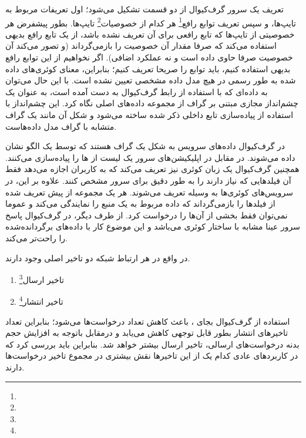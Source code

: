 تعریف یک سرور گرف‌کیوال از دو قسمت تشکیل می‌شود؛ اول تعریفات مربوط به تایپ‌ها، و سپس تعریف توابع رافع\footnote{} هر کدام از خصوصیات\footnote{} تایپ‌ها. بطور پیشفرض هر خصوصیتی از تایپ‌ها که تابع رافعی برای آن تعریف نشده باشد، از یک تابع رافع بدیهی استفاده می‌کند که صرفا مقدار آن خصوصیت را بازمی‌گرداند (و تصور می‌کند آن خصوصیت صرفا حاوی داده است و نه عملکرد اضافی). اگر نخواهیم از این توابع رافع بدیهی استفاده کنیم، باید توابع را صریحا تعریف کنیم؛ بنابراین، معنای کوئری‌های داده شده به طور رسمی در هیچ مدل داده‌ مشخصی تعیین نشده است. با این حال می‌توان به داده‌ای که با استفاده از رابط گرف‌کیوال به دست آمده است، به عنوان یک چشم‌انداز مجازی مبتنی بر گراف از مجموعه داده‌های اصلی نگاه کرد. این چشم‌انداز با استفاده از پیاده‌سازی تابع داخلی ذکر شده ساخته می‌شود و شکل آن مانند یک گراف متشابه با گراف مدل داده‌هاست\cite{hartig2017initial}.

\newpage


در گرف‌کیوال داده‌های سرویس به شکل یک گراف هستند که توسط یک الگو نشان داده می‌شوند. در مقابل در  اپلیکیشن‌های سرور یک لیست از ها را پیاده‌سازی می‌کنند. همچنین گرف‌کیوال یک زبان کوئری نیز تعریف می‌کند که به کاربران اجازه می‌دهد فقط آن فیلدهایی که نیاز دارند را به طور دقیق برای سرور مشخص کنند. علاوه بر این، در سرویس‌های  کوئری‌ها به وسیله  تعریف می‌شوند. هر  یک مجموعه از پیش تعریف شده از فیلدها را بازمی‌گرداند که داده مربوط به یک منبع را نمایندگی می‌کند و عموما نمی‌توان فقط بخشی از آن‌ها را درخواست کرد. از طرف دیگر، در گرف‌کیوال پاسخ سرور عینا مشابه با ساختار کوئری می‌باشد و این موضوع کار با داده‌های برگردانده‌شده را راحت‌تر می‌کند\cite{brito2020rest}.

در واقع در هر ارتباط شبکه دو تاخیر اصلی وجود دارند.
\begin{enumerate}
	\item تاخیر ارسال\footnote{}
	\item تاخیر انتشار\footnote{}
\end{enumerate}

استفاده از گرف‌کیوال بجای ،‌ باعث کاهش تعداد درخواست‌ها می‌شود؛ بنابراین تعداد تاخیرهای انتشار بطور قابل توجهی کاهش می‌یابد و درمقابل باتوجه به افزایش حجم بدنه درخواست‌های ارسالی، تاخیر ارسال بیشتر خواهد شد. بنابراین باید بررسی کرد که در کاربردهای عادی  کدام یک از این تاخیرها نقش بیشتری در مجموع تاخیر درخواست‌ها دارند.

